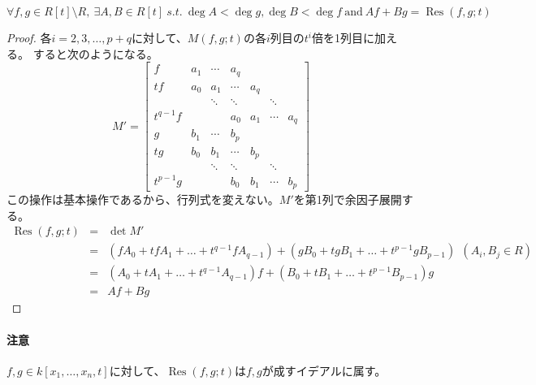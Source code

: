\documentclass[a4]{article}
\newcommand{\Res}{\operatorname{Res}}
\begin{document}
        \begin{Prop}
            \[
                \forall f,g \in R[t] \setminus R,~\exists A, B \in R[t]~s.t.~
                \deg A < \deg g, \deg B < \deg f ~\mbox{and}~ Af+Bg=\Res(f,g;t)
            \]
        \end{Prop}
        \begin{proof}
            各$i=2,3,\dots,p+q$に対して、$M(f,g;t)$の各$i$列目の$t^i$倍を1列目に加える。
            すると次のようになる。
            \[
                M'=
                \begin{bmatrix}
                    f&          a_1&    \cdots&     a_q \\
                    tf&         a_0&    a_1&        \cdots&     a_q \\
                    {}&         {}&     \ddots&     \ddots&     {}&     \ddots& \\
                    t^{q-1}f&   {}&     {}&         a_0&        a_1&    \cdots&    a_q \\
                    g&          b_1&    \cdots&     b_p \\
                    tg&         b_0&    b_1&        \cdots&     b_p \\
                    {}&         {}&     \ddots&     \ddots&     {}&     \ddots& \\
                    t^{p-1}g&   {}&     {}&         b_0&        b_1&    \cdots&    b_p
                \end{bmatrix}
            \]
            この操作は基本操作であるから、行列式を変えない。$M'$を第1列で余因子展開する。
            \begin{eqnarray*}
                \Res(f,g;t) &=& \det M' \\
                &=& (f A_0+tf A_1+\dots+t^{q-1}f A_{q-1})
                + (g B_0+tg B_1+\dots+t^{p-1}g B_{p-1}) ~~ (A_i, B_j \in R)\\
                &=& (A_0+t A_1+\dots+t^{q-1} A_{q-1})f+(B_0+t B_1+\dots+t^{p-1} B_{p-1})g \\
                &=& Af+Bg
            \end{eqnarray*}
            
        \end{proof}

        \paragraph{注意}
        $f,g \in k[x_1, \dots, x_n, t]$に対して、$\Res(f,g; t)$は$f,g$が成すイデアルに属す。
\end{document}
